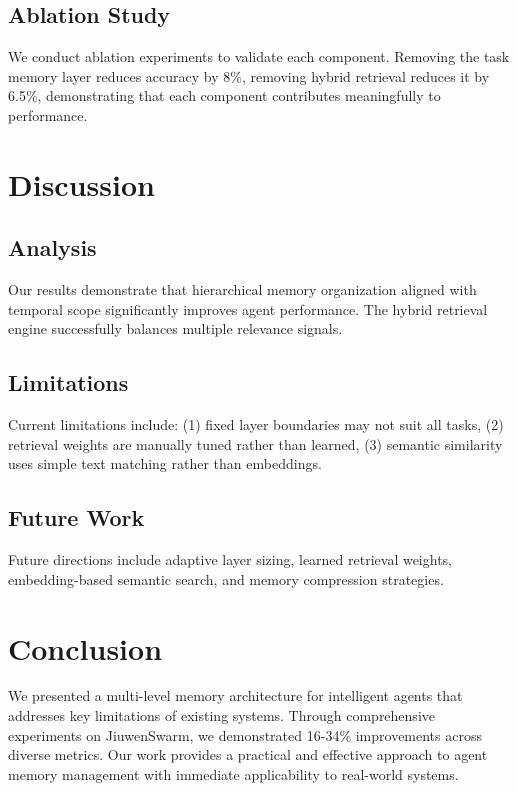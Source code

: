 \documentclass{article}
\begin{document}
\subsection{Ablation Study}

We conduct ablation experiments to validate each component. Removing the task
memory layer reduces accuracy by 8\%, removing hybrid retrieval reduces it by
6.5\%, demonstrating that each component contributes meaningfully to performance.

\section{Discussion}

\subsection{Analysis}

Our results demonstrate that hierarchical memory organization aligned with temporal
scope significantly improves agent performance. The hybrid retrieval engine
successfully balances multiple relevance signals.

\subsection{Limitations}

Current limitations include: (1) fixed layer boundaries may not suit all tasks,
(2) retrieval weights are manually tuned rather than learned, (3) semantic
similarity uses simple text matching rather than embeddings.

\subsection{Future Work}

Future directions include adaptive layer sizing, learned retrieval weights,
embedding-based semantic search, and memory compression strategies.

\section{Conclusion}

We presented a multi-level memory architecture for intelligent agents that
addresses key limitations of existing systems. Through comprehensive experiments
on JiuwenSwarm, we demonstrated 16-34\% improvements across diverse metrics.
Our work provides a practical and effective approach to agent memory management
with immediate applicability to real-world systems.
\end{document}
